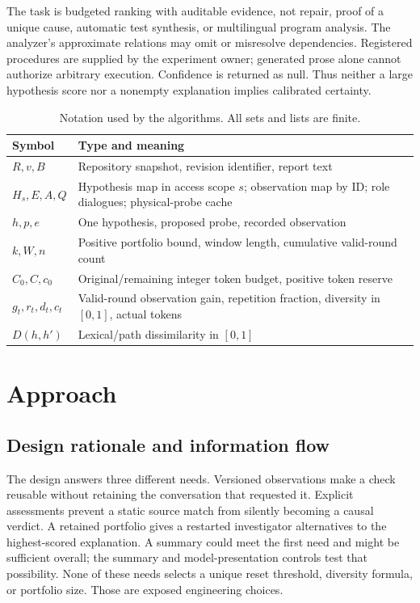 \documentclass[letterpaper,journal]{IEEEtran}
\begin{document}
The task is budgeted ranking with auditable evidence, not repair, proof of a unique cause, automatic test synthesis, or multilingual program analysis. The analyzer's approximate relations may omit or misresolve dependencies. Registered procedures are supplied by the experiment owner; generated prose alone cannot authorize arbitrary execution. Confidence is returned as null. Thus neither a large hypothesis score nor a nonempty explanation implies calibrated certainty.

\begin{table}[t]
\caption{Notation used by the algorithms. All sets and lists are finite.}\label{tab:notation}
\centering\small
\begin{tabular}{@{}p{}p{}@{}}\toprule
Symbol & Type and meaning\\\midrule
$R,v,B$ & Repository snapshot, revision identifier, report text\\
$H_s,E,A,Q$ & Hypothesis map in access scope $s$; observation map by ID; role dialogues; physical-probe cache\\
$h,p,e$ & One hypothesis, proposed probe, recorded observation\\
$k,W,n$ & Positive portfolio bound, window length, cumulative valid-round count\\
$C_0,C,c_0$ & Original/remaining integer token budget, positive token reserve\\
$g_t,r_t,d_t,c_t$ & Valid-round observation gain, repetition fraction, diversity in $[0,1]$, actual tokens\\
$D(h,h')$ & Lexical/path dissimilarity in $[0,1]$\\
\bottomrule\end{tabular}
\end{table}

\section{Approach}\label{sec:approach}
\subsection{Design rationale and information flow}
The design answers three different needs. Versioned observations make a check reusable without retaining the conversation that requested it. Explicit assessments prevent a static source match from silently becoming a causal verdict. A retained portfolio gives a restarted investigator alternatives to the highest-scored explanation. A summary could meet the first need and might be sufficient overall; the summary and model-presentation controls test that possibility. None of these needs selects a unique reset threshold, diversity formula, or portfolio size. Those are exposed engineering choices.
\end{document}
